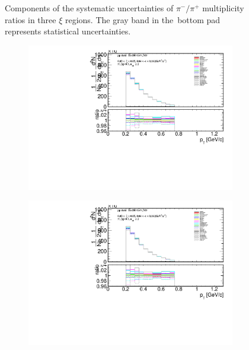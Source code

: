 \begin{figure}[h!]
\begin{subfigure}{.49\textwidth}
	\end{subfigure}
	\begin{minipage}{.49\textwidth}
		\caption{Components of the systematic uncertainties of $\pi^-/\pi^+$ multiplicity ratios  in three $\xi$ regions. The gray band in the~bottom pad represents statistical uncertainties.}
		\label{fig:results_star_syst_pi}
	\end{minipage}
	\vspace{-2.5cm}
\end{figure}


\begin{figure}[h!]
	\vspace{-2.5cm}
	\centering
		\begin{subfigure}{.49\textwidth}
			\includegraphics[width=\textwidth,page=22]{chapters/chrgSTAR/img/syst/outPID_SDT.pdf}
		\end{subfigure}
		\begin{subfigure}{.49\textwidth}
			\includegraphics[width=\textwidth,page=23]{chapters/chrgSTAR/img/syst/outPID_SDT.pdf}

\end{subfigure}
\end{figure}
